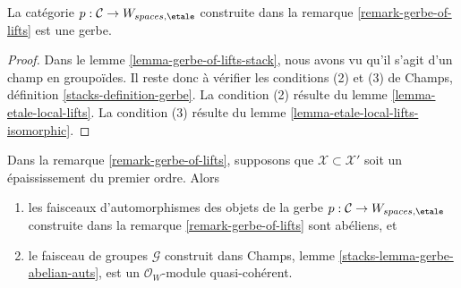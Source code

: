\begin{lemma}
\label{lemma-gerbe-of-lifts}
La catégorie $p : \mathcal{C} \to W_{spaces, \etale}$ construite
dans la remarque \ref{remark-gerbe-of-lifts} est une gerbe.
\end{lemma}

\begin{proof}
Dans le lemme \ref{lemma-gerbe-of-lifts-stack},
nous avons vu qu'il s'agit d'un champ en groupoïdes.
Il reste donc à vérifier les conditions (2) et (3) de
Champs, définition \ref{stacks-definition-gerbe}.
La condition (2) résulte du
lemme \ref{lemma-etale-local-lifts}.
La condition (3) résulte du
lemme \ref{lemma-etale-local-lifts-isomorphic}.
\end{proof}

\begin{lemma}
\label{lemma-gerbe-of-lifts-first-order}
Dans la remarque \ref{remark-gerbe-of-lifts}, supposons que $\mathcal{X} \subset \mathcal{X}'$
soit un épaississement du premier ordre. Alors
\begin{enumerate}
\item les faisceaux d'automorphismes des objets de la gerbe
$p : \mathcal{C} \to W_{spaces, \etale}$ construite
dans la remarque \ref{remark-gerbe-of-lifts} sont abéliens, et
\item le faisceau de groupes $\mathcal{G}$ construit dans
Champs, lemme \ref{stacks-lemma-gerbe-abelian-auts},
est un $\mathcal{O}_W$-module quasi-cohérent.
\end{enumerate}
\end{lemma}

